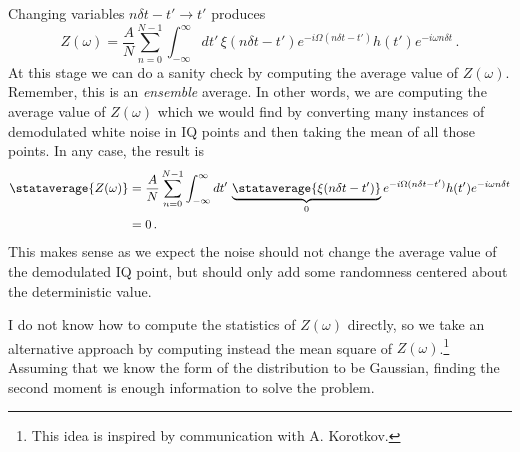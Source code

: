 Changing variables $n \delta t - t' \rightarrow t'$ produces
\begin{equation}
Z(\omega) = \frac{A}{N} \sum_{n=0}^{N-1} \int_{-\infty}^\infty dt' \, \xi(n \delta t - t') e^{-i \Omega (n \delta t - t')} h(t') e^{-i \omega n \delta t}  \, .
\end{equation}
At this stage we can do a sanity check by computing the average value of $Z(\omega)$.
Remember, this is an \emph{ensemble} average.
In other words, we are computing the average value of $Z(\omega)$ which we would find by converting many instances of demodulated white noise in IQ points and then taking the mean of all those points.
In any case, the result is
\begin{align}
\stataverage{Z(\omega)}
&= \frac{A}{N} \sum_{n=0}^{N-1} \int_{-\infty}^\infty dt' \, \underbrace{\stataverage{\xi(n \delta t - t')}}_0 e^{-i \Omega (n \delta t - t')} h(t') e^{-i \omega n \delta t} \\
&= 0 \, .
\end{align}
This makes sense as we expect the noise should not change the average value of the demodulated IQ point, but should only add some randomness centered about the deterministic value.


I do not know how to compute the statistics of $Z(\omega)$ directly, so we take an alternative approach by computing instead the mean square of $Z(\omega)$.\footnote{This idea is inspired by communication with A. Korotkov.}
Assuming that we know the form of the distribution to be Gaussian, finding the second moment is enough information to solve the problem.

